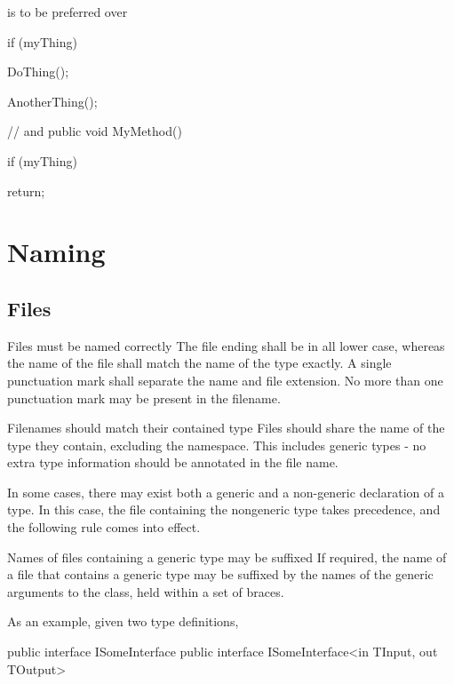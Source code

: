 \documentclass[11pt,a4paper]{article}
\newcounter{rule}[section]
\begin{document}
is to be preferred over

\begin{code}
if (myThing)
{

    DoThing();
}

AnotherThing();

// and
public void MyMethod()
{
    if (myThing)
    {
    
        return;
        
    }
    
}
\end{code}

\section{Naming}
\subsection{Files}
\begin{must}{Files must be named correctly}
The file ending shall be in all lower case, whereas the name of the file shall match the name of the type exactly. A single punctuation mark shall separate the name and file extension. No more than one punctuation mark may be present in the filename.
\end{must}

\begin{should}{Filenames should match their contained type}
Files should share the name of the type they contain, excluding the namespace. This includes generic types - no extra type information should be annotated in the file name.
\end{should}

In some cases, there may exist both a generic and a non-generic declaration of a type. In this case, the file containing the nongeneric type takes precedence, and the following rule comes into effect.

\begin{may}{Names of files containing a generic type may be suffixed}
If required, the name of a file that contains a generic type may be suffixed by the names of the generic arguments to the class, held within a set of braces.
\end{may}

As an example, given two type definitions,

\begin{code}
public interface ISomeInterface { }
public interface ISomeInterface<in TInput, out TOutput> { }
\end{code}
\end{document}
